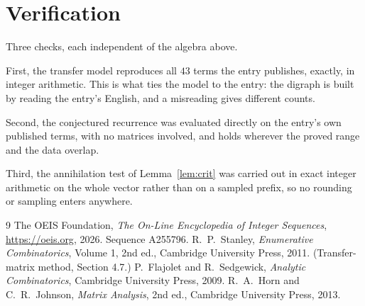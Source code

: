 \documentclass[11pt,a4paper]{article}
\theoremstyle{plain}
\theoremstyle{definition}
\begin{document}
\section{Verification}

Three checks, each independent of the algebra above.

First, the transfer model reproduces all $43$ terms the entry publishes, exactly, in
integer arithmetic. This is what ties the model to the entry: the digraph is built by reading
the entry's English, and a misreading gives different counts.

Second, the conjectured recurrence was evaluated directly on the entry's own published terms,
with no matrices involved, and holds wherever the proved range and the data overlap.

Third, the annihilation test of Lemma~\ref{lem:crit} was carried out in exact integer
arithmetic on the whole vector rather than on a sampled prefix, so no rounding or sampling
enters anywhere.

\begin{thebibliography}{9}
 The OEIS Foundation, \emph{The On-Line Encyclopedia of Integer
Sequences}, \url{https://oeis.org}, 2026. Sequence A255796.
 R.~P.~Stanley, \emph{Enumerative Combinatorics}, Volume 1, 2nd ed.,
Cambridge University Press, 2011. (Transfer-matrix method, Section 4.7.)
 P.~Flajolet and R.~Sedgewick, \emph{Analytic Combinatorics}, Cambridge
University Press, 2009.
 R.~A.~Horn and C.~R.~Johnson, \emph{Matrix Analysis}, 2nd ed., Cambridge
University Press, 2013.
\end{thebibliography}
\end{document}
